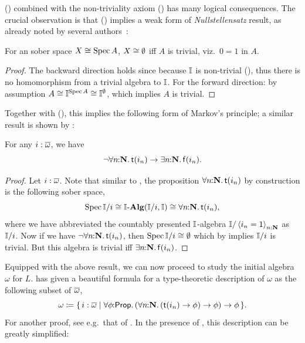 (\AxiomSQCC) combined with the non-triviality axiom (\AxiomNT) has many logical consequences. The crucial observation is that (\AxiomNT) implies a weak form of \emph{Nullstellensatz} result, as already noted by several authors~\citep{blechschmidt2021using,blechschmidt2020general,Cherubini_Coquand_Hutzler_2024}:

\begin{lemma}[\AxiomNT]\label{lem:nulls}
  For an sober space $X \cong \operatorname{Spec} A$, $X \cong \emptyset$ iff $A$ is trivial, viz.\ $0=1$ in $A$.
\end{lemma}
\begin{proof}
  The backward direction holds since because $\mathbb{I}$ is non-trivial (\AxiomNT), thus there is no homomorphism from a trivial algebra to $\mathbb{I}$. For the forward direction: by assumption $A \cong \mathbb{I}^{\operatorname{Spec} A} \cong \mathbb{I}^\emptyset$, which implies $A$ is trivial. 
\end{proof}

Together with (\AxiomSQCC), this implies the following form of Markov's principle; a similar result is shown by \citet{cherubini2024foundation}:

\begin{lemma}[\AxiomNT, \AxiomSQCC]\label{lem:markov}
  For any $i : \overline{\omega}$, we have
  \[ \neg\fa{n}{\N}\ist{i_n} \to \ex n\N\isf{i_n}\text{.} \]
\end{lemma}
\begin{proof}
  Let $i : \overline{\omega}$. Note that similar to , the proposition $\forall n\!\colon\!\!\mathbf{N}\mathpunct{.} \mathsf{t}(i_n)$ by construction is the following sober space, 
  \[ \spec\I/i \cong \I\alg(\I/i,\I) \cong \fa n\N \ist{i_n}\text{,} \]
  where we have abbreviated the countably presented $\mathbb{I}$-algebra $\mathbb{I}/\left\langle i_n=1\right\rangle_{n:\mathbf{N}}$ as $\mathbb{I}/i$. Now if we have $\neg\forall n\!\colon\!\!\mathbf{N}\mathpunct{.} \mathsf{t}(i_n)$, then $\operatorname{Spec}\mathbb{I}/i \cong \emptyset$ which by  implies $\mathbb{I}/i$ is trivial. But this algebra is trivial iff $\exists n\!\colon\!\!\mathbf{N}\mathpunct{.} \mathsf{f}(i_n)$.
\end{proof}

Equipped with the above result, we can now proceed to study the initial algebra $\omega$ for $L$. \citet{JIBLADZE1997185} has given a beautiful formula for a type-theoretic description of $\omega$ as the following subset of $\overline{\omega}$, 
\[ \omega \coloneq \scomp{i : \ov\omega}{\fa\phi{\pp} (\fa n{\N} (\ist{i_n} \to \phi) \to \phi) \to \phi}\text{.} \]
For another proof, see e.g.\ that of \citet{VANOOSTEN2000233}. In the presence of , this description can be greatly simplified:

